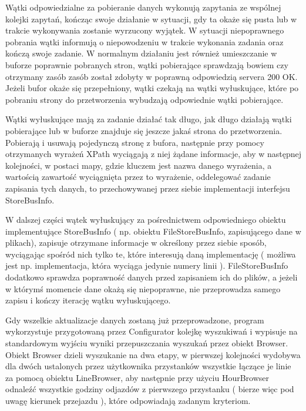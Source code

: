 \documentclass[11pt]{article}
\begin{document}
Wątki odpowiedzialne za pobieranie danych wykonują zapytania ze wspólnej kolejki zapytań, kończąc swoje działanie w sytuacji, gdy ta okaże się pusta lub w trakcie wykonywania zostanie wyrzucony wyjątek. W sytuacji niepoprawnego pobrania wątki informują o niepowodzeniu w trakcie wykonania zadania oraz kończą swoje zadanie. W normalnym działaniu jest również umieszczanie w buforze poprawnie pobranych stron, wątki pobierające sprawdzają bowiem czy otrzymany zasób zasób został zdobyty w poprawną odpowiedzią servera 200 OK. Jeżeli bufor okaże się przepełniony, wątki czekają na wątki wyłuskujące, które po pobraniu strony do przetworzenia wybudzają odpowiednie wątki pobierające.\newline

Wątki wyłuskujące mają za zadanie działać tak długo, jak długo działają wątki pobierające lub w buforze znajduje się jeszcze jakaś strona do przetworzenia. Pobierają i usuwają pojedynczą stronę z bufora, następnie przy pomocy otrzymanych wyrażeń XPath wyciągają z niej żądane informacje, aby w następnej kolejności, w postaci mapy, gdzie kluczem jest nazwa danego wyrażenia, a wartością zawartość wyciągnięta przez to wyrażenie, oddelegować zadanie zapisania tych danych, to przechowywanej przez siebie implementacji interfejsu StoreBusInfo.\newline

W dalszej części wątek wyłuskujący za pośrednictwem odpowiedniego obiektu implementujące StoreBusInfo ( np. obiektu FileStoreBusInfo, zapisującego dane w plikach), zapisuje otrzymane informacje w określony przez siebie sposób, wyciągając spośród nich tylko te, które interesują daną implementację ( możliwa jest np. implementacja, która wyciąga jedynie numery linii ). FileStoreBusInfo dodatkowo sprawdza poprawność danych przed zapisaniem ich do plików, a jeżeli w którymś momencie dane okażą się niepoprawne, nie przeprowadza samego zapisu i kończy iterację wątku wyłuskującego.\newline

Gdy wszelkie aktualizacje danych zostaną już przeprowadzone, program wykorzystuje przygotowaną przez Configurator kolejkę wyszukiwań i wypisuje na standardowym wyjściu wyniki przepuszczania wyszukań przez obiekt Browser. Obiekt Browser dzieli wyszukanie na dwa etapy, w pierwszej kolejności wydobywa dla dwóch ustalonych przez użytkownika przystanków wszystkie łączące je linie za pomocą obiektu LineBrowser, aby następnie przy użyciu HourBrowser odnaleźć wszystkie godziny odjazdów z pierwszego przystanku ( bierze więc pod uwagę kierunek przejazdu ), które odpowiadają zadanym kryteriom.\newline
\end{document}
